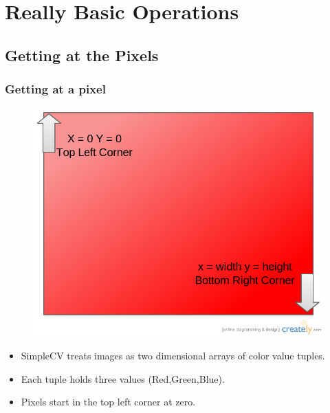 \documentclass{beamer}
\begin{document}
\section{Really Basic Operations}
\subsection{Getting at the Pixels}
\begin{frame}
\frametitle{Getting at a pixel}
\begin{figure}
  \includegraphics[width=0.5\linewidth]{pixellocations.png}
\end{figure}
\begin{itemize}
\item SimpleCV treats images as two dimensional arrays of color
value tuples. 
\item Each tuple holds three values (Red,Green,Blue).
\item Pixels start in the top left corner at zero. 
\end{itemize}
\end{frame}
\end{document}

